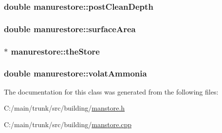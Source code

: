 \label{classmanurestore_ac2155ea6f170c51b86b20f809ead9502}
\hypertarget{classmanurestore_a8e380412792126807f34460d47fca98b}{
\subsubsection[{postCleanDepth}]{\setlength{\rightskip}{0pt plus 5cm}double {\bf manurestore::postCleanDepth}}}
\label{classmanurestore_a8e380412792126807f34460d47fca98b}
\hypertarget{classmanurestore_a061d3a49dadcf3d8de36417c7cf125d3}{
\subsubsection[{surfaceArea}]{\setlength{\rightskip}{0pt plus 5cm}double {\bf manurestore::surfaceArea}}}
\label{classmanurestore_a061d3a49dadcf3d8de36417c7cf125d3}
\hypertarget{classmanurestore_a190469ebea4c87d3d641c73a1626c5e3}{
\subsubsection[{theStore}]{$\ast$ {\bf manurestore::theStore}}}
\label{classmanurestore_a190469ebea4c87d3d641c73a1626c5e3}
\hypertarget{classmanurestore_ac9d398e432684fb02bfaf52c2f0e9ae8}{
\subsubsection[{volatAmmonia}]{\setlength{\rightskip}{0pt plus 5cm}double {\bf manurestore::volatAmmonia}}}
\label{classmanurestore_ac9d398e432684fb02bfaf52c2f0e9ae8}


The documentation for this class was generated from the following files:\begin{DoxyCompactItemize}
\item 
C:/main/trunk/src/building/\hyperlink{manstore_8h}{manstore.h}\item 
C:/main/trunk/src/building/\hyperlink{manstore_8cpp}{manstore.cpp}\end{DoxyCompactItemize}
